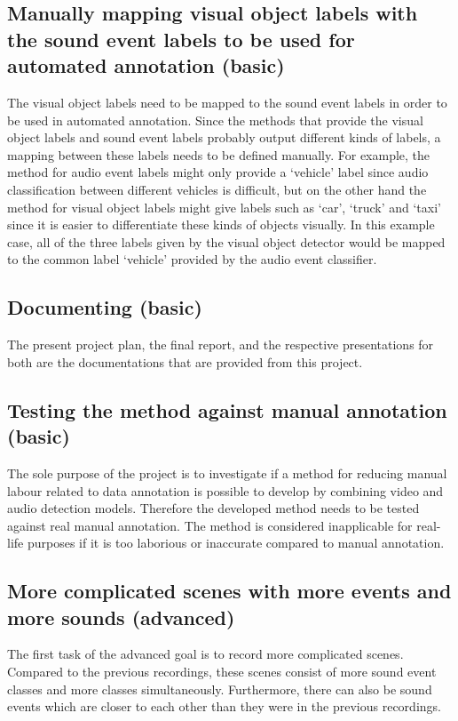 \subsection{Manually mapping visual object labels with the sound event labels to be used for automated annotation (basic)}

The visual object labels need to be mapped to the sound event labels in order to be used in automated annotation.
Since the methods that provide the visual object labels and sound event labels probably output different kinds of
labels, a mapping between these labels needs to be defined manually. For example, the method for audio event
labels might only provide a `vehicle' label since audio classification between different vehicles is difficult,
but on the other hand the method for visual object labels might give labels such as `car', `truck' and `taxi'
since it is easier to differentiate these kinds of objects visually. In this example case, all of the three
labels given by the visual object detector would be mapped to the common label `vehicle' provided by the audio
event classifier.

\subsection{Documenting (basic)}

The present project plan, the final report, and the respective presentations for both are the documentations
that are provided from this project.

\subsection{Testing the method against manual annotation (basic)}

The sole purpose of the project is to investigate if a method for reducing manual labour related to data annotation is possible to develop by combining video and audio detection models. Therefore the developed method needs to be tested against real manual annotation. The method is considered
inapplicable for real-life purposes if it is too laborious or inaccurate compared to manual
annotation.

\subsection{More complicated scenes with more events and more sounds (advanced)}

The first task of the advanced goal is to record more complicated scenes. Compared to the previous recordings, 
these scenes consist of more sound event classes and more classes simultaneously. Furthermore, there can also be
sound events which are closer to each other than they were in the previous recordings.

